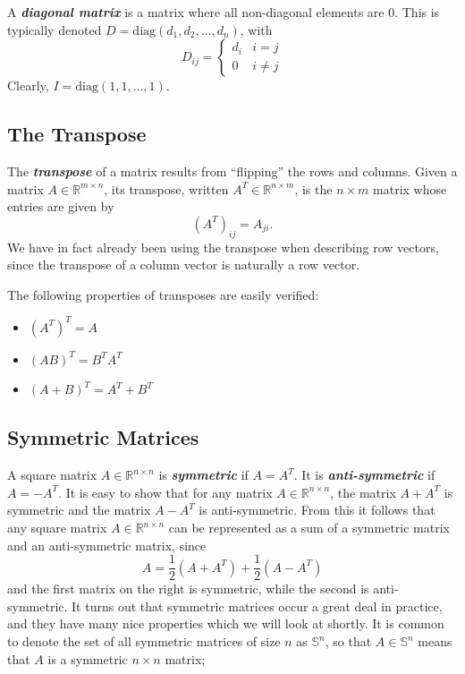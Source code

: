 \documentclass[12pt]{article}
\begin{document}
A \textbf{\textit{diagonal matrix}} is a matrix where all non-diagonal
elements are 0.  This is typically denoted $D = \mathrm{diag}(d_1,
d_2, \ldots, d_n)$, with
\[ D_{ij} = \left \{ \begin{array}{ll}d_i & i = j \\ 0 & i \neq
  j\end{array} \right . \]
Clearly, $I = \mathrm{diag}(1,1,\ldots,1)$.

\subsection{The Transpose}
The \textbf{\textit{transpose}} of a matrix results from ``flipping''
the rows and columns.  Given a matrix $A \in \mathbb{R}^{m \times n}$,
its transpose, written $A^T \in \mathbb{R}^{n \times m}$, is the $n \times m$ matrix
whose entries are given by
\[ (A^T)_{ij} = A_{ji}.\]
We have in fact already been using the transpose when describing row
vectors, since the transpose of a column vector is naturally a row
vector.

The following properties of transposes are easily verified:
\begin{itemize}
\item $(A^T)^T = A$
\item $(AB)^T = B^T A^T$
\item $(A + B)^T = A^T + B^T$
\end{itemize}

\subsection{Symmetric Matrices}
A square matrix $A \in \mathbb{R}^{n \times n}$ is
\textbf{\textit{symmetric}} if $A = A^T$.  It is
\textbf{\textit{anti-symmetric}} if $A = -A^T$.  It is easy to show
that for any matrix $A \in \mathbb{R}^{n \times n}$, the matrix
$A + A^T$ is symmetric and the matrix $A - A^T$ is anti-symmetric.
From this it follows that any square matrix $A \in \mathbb{R}^{n
  \times n}$ can be represented as a sum of a symmetric matrix and an
anti-symmetric matrix, since
\[A = \frac{1}{2}(A + A^T) + \frac{1}{2}(A - A^T)\]
and the first matrix on the right is symmetric, while the second is
anti-symmetric.  It turns out that symmetric matrices occur a great
deal in practice, and they have many nice properties which we will
look at shortly.  It is common to denote the set of all symmetric
matrices of size $n$ as $\mathbb{S}^n$, so that $A \in \mathbb{S}^n$
means that $A$ is a symmetric $n \times n$ matrix;
\end{document}
